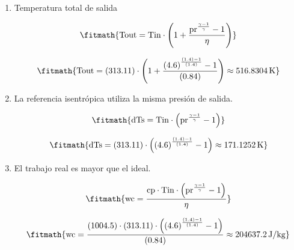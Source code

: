 \begin{enumerate}

\item Temperatura total de salida

\[\fitmath{\mathrm{Tout}=\mathrm{Tin}\cdot \left(1+\frac{{\mathrm{pr}}^{\frac{\gamma-1}{\gamma}}-1}{\eta}\right)}\]

\[\fitmath{\mathrm{Tout}=(313.11)\cdot \left(1+\frac{{(4.6)}^{\frac{(1.4)-1}{(1.4)}}-1}{(0.84)}\right)\approx 516.8304\,\mathrm{K}}\]

\item La referencia isentrópica utiliza la misma presión de salida.

\[\fitmath{\mathrm{dTs}=\mathrm{Tin}\cdot \left({\mathrm{pr}}^{\frac{\gamma-1}{\gamma}}-1\right)}\]

\[\fitmath{\mathrm{dTs}=(313.11)\cdot \left({(4.6)}^{\frac{(1.4)-1}{(1.4)}}-1\right)\approx 171.1252\,\mathrm{K}}\]

\item El trabajo real es mayor que el ideal.

\[\fitmath{\mathrm{wc}=\frac{\mathrm{cp}\cdot \mathrm{Tin}\cdot \left({\mathrm{pr}}^{\frac{\gamma-1}{\gamma}}-1\right)}{\eta}}\]

\[\fitmath{\mathrm{wc}=\frac{(1004.5)\cdot (313.11)\cdot \left({(4.6)}^{\frac{(1.4)-1}{(1.4)}}-1\right)}{(0.84)}\approx 204637.2\,\mathrm{J/kg}}\]

\end{enumerate}
